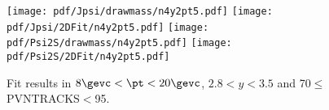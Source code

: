 \begin{figure}[H]
\begin{center}
\texttt{[image: pdf/Jpsi/drawmass/n4y2pt5.pdf]}
\texttt{[image: pdf/Jpsi/2DFit/n4y2pt5.pdf]}
\vspace*{-0.5cm}
\texttt{[image: pdf/Psi2S/drawmass/n4y2pt5.pdf]}
\texttt{[image: pdf/Psi2S/2DFit/n4y2pt5.pdf]}
\vspace*{-0.5cm}
\end{center}
\caption{Fit results in $8\gevc<\pt<20\gevc$, $2.8<y<3.5$ and 70$\leq$PVNTRACKS$<$95.}
\label{Fitn4y2pt5}
\end{figure}
